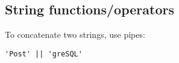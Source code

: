 \subsection{String functions/operators}
To concatenate two strings, use pipes:
\begin{verbatim}
'Post' || 'greSQL'
\end{verbatim}
%